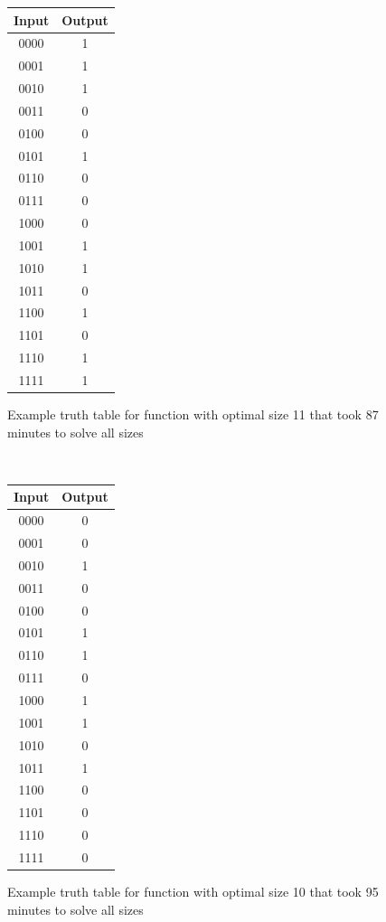 \documentclass{article}
\begin{document}
\begin{figure}[!h]

  \begin{minipage}{0.45\textwidth}
  \begin{centering}
  \begin{tabular}{ |c|c| }
  \hline
  Input & Output \\ 
  \hline
  0000 & 1 \\
  0001 & 1 \\
  0010 & 1 \\
  0011 & 0 \\
  0100 & 0 \\
  0101 & 1 \\
  0110 & 0 \\
  0111 & 0 \\
  1000 & 0 \\
  1001 & 1 \\
  1010 & 1 \\
  1011 & 0 \\
  1100 & 1 \\
  1101 & 0 \\
  1110 & 1 \\
  1111 & 1 \\
  \hline
  \end{tabular}
  \end{centering}
  \caption{Example truth table for function with optimal size 11 that took 87 minutes to solve all sizes}

  \

  \begin{centering}
    \begin{tabular}{ |c|c| }
    \hline
    Input & Output \\ 
    \hline
    0000 & 0 \\
    0001 & 0 \\
    0010 & 1 \\
    0011 & 0 \\
    0100 & 0 \\
    0101 & 1 \\
    0110 & 1 \\
    0111 & 0 \\
    1000 & 1 \\
    1001 & 1 \\
    1010 & 0 \\
    1011 & 1 \\
    1100 & 0 \\
    1101 & 0 \\
    1110 & 0 \\
    1111 & 0 \\
    \hline
    \end{tabular}
    \end{centering}
    \caption{Example truth table for function with optimal size 10 that took 95 minutes to solve all sizes}


\end{minipage}
\end{figure}
\end{document}
